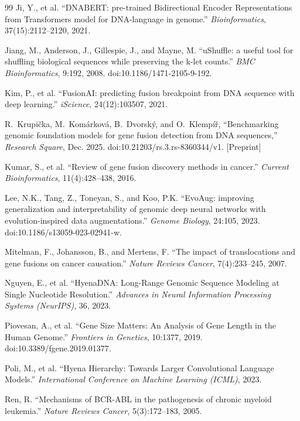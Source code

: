 \documentclass{bioinfo}
\begin{document}
\begin{thebibliography}{99}
Ji, Y., et al. ``DNABERT: pre-trained Bidirectional Encoder Representations from Transformers model for DNA-language in genome.''
\textit{Bioinformatics}, 37(15):2112--2120, 2021.

Jiang, M., Anderson, J., Gillespie, J., and Mayne, M. ``uShuffle: a useful tool for shuffling biological sequences while preserving the k-let counts.''
\textit{BMC Bioinformatics}, 9:192, 2008. doi:10.1186/1471-2105-9-192.

Kim, P., et al. ``FusionAI: predicting fusion breakpoint from DNA sequence with deep learning.''
\textit{iScience}, 24(12):103507, 2021.

R.~Krupi{\v{c}}ka, M.~Kom{\'a}rkov{\'a}, B.~Dvorsk{\'y}, and O.~Klemp{\'i}{\v{r}}, ``Benchmarking genomic foundation models for gene fusion detection from DNA sequences,''
\textit{Research Square}, Dec. 2025. doi:10.21203/rs.3.rs-8360344/v1. [Preprint]

Kumar, S., et al. ``Review of gene fusion discovery methods in cancer.''
\textit{Current Bioinformatics}, 11(4):428--438, 2016.

Lee, N.K., Tang, Z., Toneyan, S., and Koo, P.K. ``EvoAug: improving generalization and interpretability of genomic deep neural networks with evolution-inspired data augmentations.''
\textit{Genome Biology}, 24:105, 2023. doi:10.1186/s13059-023-02941-w.

Mitelman, F., Johansson, B., and Mertens, F. ``The impact of translocations and gene fusions on cancer causation.''
\textit{Nature Reviews Cancer}, 7(4):233--245, 2007.

Nguyen, E., et al. ``HyenaDNA: Long-Range Genomic Sequence Modeling at Single Nucleotide Resolution.''
\textit{Advances in Neural Information Processing Systems (NeurIPS)}, 36, 2023.

Piovesan, A., et al. ``Gene Size Matters: An Analysis of Gene Length in the Human Genome.''
\textit{Frontiers in Genetics}, 10:1377, 2019. doi:10.3389/fgene.2019.01377.

Poli, M., et al. ``Hyena Hierarchy: Towards Larger Convolutional Language Models.''
\textit{International Conference on Machine Learning (ICML)}, 2023.

Ren, R. ``Mechanisms of BCR-ABL in the pathogenesis of chronic myeloid leukemia.''
\textit{Nature Reviews Cancer}, 5(3):172--183, 2005.


\end{thebibliography}
\end{document}
